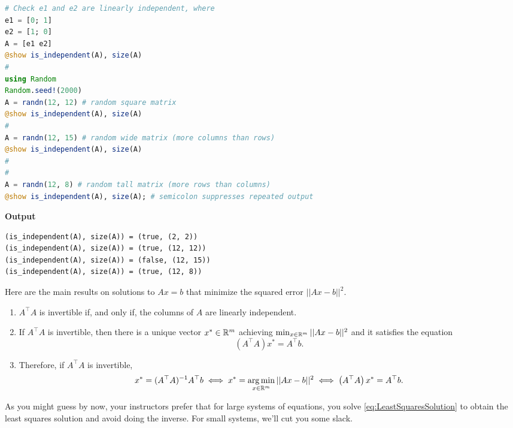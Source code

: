 \begin{lstlisting}[language=Julia,style=mystyle]
# Check e1 and e2 are linearly independent, where
e1 = [0; 1]
e2 = [1; 0]
A = [e1 e2]
@show is_independent(A), size(A)
#
using Random
Random.seed!(2000)
A = randn(12, 12) # random square matrix
@show is_independent(A), size(A)
#
A = randn(12, 15) # random wide matrix (more columns than rows)
@show is_independent(A), size(A)
#
#
A = randn(12, 8) # random tall matrix (more rows than columns)
@show is_independent(A), size(A); # semicolon suppresses repeated output
\end{lstlisting}
\textbf{Output} 
\begin{verbatim}
(is_independent(A), size(A)) = (true, (2, 2))
(is_independent(A), size(A)) = (true, (12, 12))
(is_independent(A), size(A)) = (false, (12, 15))
(is_independent(A), size(A)) = (true, (12, 8))
\end{verbatim}

\begin{tcolorbox}[sharp corners, colback=green!30, colframe=green!80!blue, title=\textbf{\large Least Squares Solutions to Linear Equations}]
Here are the main results on solutions to $Ax=b$ that minimize the squared error $||Ax-b||^2$.
\begin{enumerate}
\renewcommand{\labelenumi}{(\alph{enumi})}
\setlength{\itemsep}{.2cm}

\item $A^\top A$ is invertible if, and only if, the columns of $A$ are linearly independent.

\item If $A^\top A$ is invertible, then there is a unique vector $x^\ast \in \mathbb R^m$ achieving $\min_{x \in \mathbb R^m } ||Ax-b ||^2$ and it satisfies the equation
\begin{equation}
    \label{eq:LeastSquaresSolution}
    \left(A^\top A \right) x^\ast = A^\top b.
\end{equation}
\item Therefore, if $A^\top A$ is invertible, 
\begin{equation}
    \label{eq:ThmLeastSqaredErrorSolution}
  x^\ast = (A^\top A)^{-1} A^\top b  \iff  x^\ast = \operatorname*{arg\,min}_{x \in \mathbb R^m} ||Ax-b ||^2 \iff \left(A^\top A \right) x^\ast = A^\top b.
\end{equation}
\end{enumerate}
As you might guess by now, your instructors prefer that for large systems of equations, you solve \eqref{eq:LeastSquaresSolution} to obtain the least squares solution and avoid doing the inverse. For small systems, we'll cut you some slack.
\end{tcolorbox}

